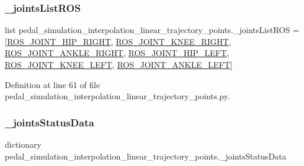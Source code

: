 \subsubsection{\texorpdfstring{\_jointsListROS}{\_jointsListROS}}
{\footnotesize\ttfamily list pedal\+\_\+simulation\+\_\+interpolation\+\_\+linear\+\_\+trajectory\+\_\+points.\+\_\+joints\+List\+R\+OS = \mbox{[}\mbox{\hyperlink{namespacepedal__simulation__interpolation__linear__trajectory__points_a073eb93be3570097fd140f4488393467}{R\+O\+S\+\_\+\+J\+O\+I\+N\+T\+\_\+\+H\+I\+P\+\_\+\+R\+I\+G\+HT}}, \mbox{\hyperlink{namespacepedal__simulation__interpolation__linear__trajectory__points_af1c84f3b73df0161dd11c10d2faa4112}{R\+O\+S\+\_\+\+J\+O\+I\+N\+T\+\_\+\+K\+N\+E\+E\+\_\+\+R\+I\+G\+HT}}, \mbox{\hyperlink{namespacepedal__simulation__interpolation__linear__trajectory__points_a593c7b6f49b5c4ba041aa3efe609fb75}{R\+O\+S\+\_\+\+J\+O\+I\+N\+T\+\_\+\+A\+N\+K\+L\+E\+\_\+\+R\+I\+G\+HT}}, \mbox{\hyperlink{namespacepedal__simulation__interpolation__linear__trajectory__points_a4134acdea8d46c49c3031087a5dfa459}{R\+O\+S\+\_\+\+J\+O\+I\+N\+T\+\_\+\+H\+I\+P\+\_\+\+L\+E\+FT}}, \mbox{\hyperlink{namespacepedal__simulation__interpolation__linear__trajectory__points_a0e2787b945854e034b47dec8918298f2}{R\+O\+S\+\_\+\+J\+O\+I\+N\+T\+\_\+\+K\+N\+E\+E\+\_\+\+L\+E\+FT}}, \mbox{\hyperlink{namespacepedal__simulation__interpolation__linear__trajectory__points_a601687afe04f4c7814fee7ac4af804f6}{R\+O\+S\+\_\+\+J\+O\+I\+N\+T\+\_\+\+A\+N\+K\+L\+E\+\_\+\+L\+E\+FT}}\mbox{]}\hspace{0.3cm}{\ttfamily [private]}}



Definition at line 61 of file pedal\+\_\+simulation\+\_\+interpolation\+\_\+linear\+\_\+trajectory\+\_\+points.\+py.

\mbox{\label{namespacepedal__simulation__interpolation__linear__trajectory__points_a12bf389baf4d2446ef9913c03d1f8d9f}} 
\subsubsection{\texorpdfstring{\_jointsStatusData}{\_jointsStatusData}}
{\footnotesize\ttfamily dictionary pedal\+\_\+simulation\+\_\+interpolation\+\_\+linear\+\_\+trajectory\+\_\+points.\+\_\+joints\+Status\+Data\hspace{0.3cm}{\ttfamily [private]}}

